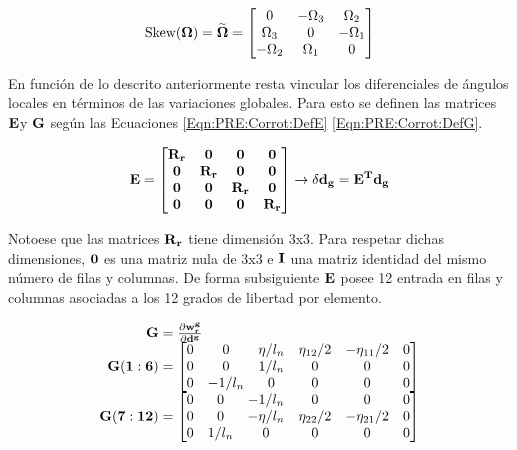 \begin{equation}\label{eq:PRE:Skew}
	\text{Skew}(\bf{\Omega})=\widetilde{\bf{\Omega}}
	=
	\begin{bmatrix}
		0 &-\Omega_3  &\Omega_2   \\
		\Omega_3&0  & -\Omega_1  \\
		-\Omega_2  & \Omega_1 & 0
	\end{bmatrix}
\end{equation}

En función de lo descrito anteriormente resta vincular los diferenciales de ángulos locales en términos de las variaciones globales. Para esto se definen las matrices $\bf{E} $y $\bf{G}$ según las Ecuaciones \eqref{Eqn:PRE:Corrot:DefE} \eqref{Eqn:PRE:Corrot:DefG}.

\begin{equation}\label{Eqn:PRE:Corrot:DefE}
	\bf{E}=\begin{bmatrix}
		\bf{R_r}& \bf{0}   & \bf{0}   & \bf{0} \\
		\bf{0}  & \bf{R_r} & \bf{0}   & \bf{0}\\
		\bf{0}  & \bf{0}   & \bf{R_r} & \bf{0} \\
		\bf{0}  & \bf{0}   & \bf{0}   & \bf{R_r}
	\end{bmatrix}\rightarrow \delta \bf{d_g}=E^T \bf{d_g}
\end{equation}

Notoese que las matrices $\bf{R}_r$ tiene dimensión 3x3. Para respetar dichas dimensiones, $\bf{0}$ es una matriz nula de 3x3 e $\bf{I}$ una matriz identidad del mismo número de filas y columnas. De forma subsiguiente $\bf{E}$ posee 12 entrada en filas y columnas asociadas a los 12 grados de libertad por elemento.

\begin{equation}\label{Eqn:PRE:Corrot:DefG}
	\begin{array}{r@{}l}
		\bf{G}&{}=\frac{\partial \bf{w_r^g}}{\partial \bf{d}^g}\\
		\bf{G}(1:6)&{}=\begin{bmatrix}
			0 &  0      &  \eta/l_n &  \eta_{12}/2  &-\eta_{11}/2  &  0  \\
			0 &  0      &   1/l_n   &       0       &      0       &  0   \\
			0 & -1/l_n  &      0    &       0       &      0       &  0
		\end{bmatrix}\\
		\bf{G}(7:12)&{}=\begin{bmatrix}
			0  &  0    &   -1/l_n   &      0      &     0        &    0 \\
			0  &  0     &-\eta/l_n  & \eta_{22}/2 &-\eta_{21}/2  &    0 \\
			0  &  1/l_n &       0   &      0      &     0        &    0
		\end{bmatrix}
	\end{array}
\end{equation}


